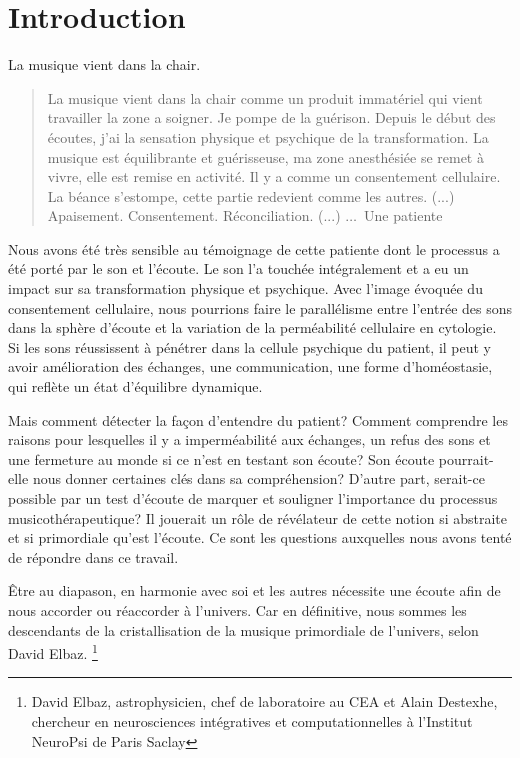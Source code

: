 \chapter{Introduction}

La musique vient dans la chair.

\begin{quotation}
 La musique vient dans la chair comme un produit immatériel
 qui vient travailler la zone a soigner. Je pompe de la
 guérison.
Depuis le début des écoutes, j'ai la sensation physique et
 psychique de la
 transformation.
 La musique est équilibrante et guérisseuse, ma zone
 anesthésiée se remet à vivre, elle est remise en activité.
 Il y a comme un consentement cellulaire.
La béance s'estompe, cette
partie redevient comme les autres. (...)
Apaisement. Consentement. Réconciliation.  (...)
$\ldots$\  Une patiente\autocite{Témoignage}
\end{quotation}

Nous avons été très sensible au témoignage de cette patiente dont le
processus a été porté par le son et l'écoute. Le son l'a touchée intégralement et a eu un impact sur sa transformation physique
et psychique.
Avec l'image évoquée du
consentement cellulaire, nous pourrions faire le
parallélisme entre l'entrée des sons dans la sphère d'écoute et la variation de la 
perméabilité cellulaire en cytologie.\autocite[ch. 3 pp. 70--76]{marieb:biologie}  Si les sons réussissent à pénétrer dans la
cellule psychique du patient, il peut y avoir amélioration des
échanges, une 
communication, une forme d'homéostasie,  \autocite[ch. 1
pp. 10]{marieb:biologie} qui reflète un état d'équilibre dynamique.

Mais comment détecter la façon d'entendre du patient?
Comment comprendre les raisons pour lesquelles il y a imperméabilité aux
échanges, un refus des sons et une fermeture au monde si ce n'est en testant
son écoute?  Son écoute pourrait-elle nous donner certaines clés dans sa
compréhension? D'autre part, serait-ce  possible  par un test d'écoute
de marquer et souligner l'importance du processus musicothérapeutique? 
Il jouerait un
rôle de
révélateur de cette notion si abstraite et si primordiale qu'est l'écoute.
Ce sont les questions auxquelles nous avons tenté de
répondre dans ce travail.


Être au diapason, en harmonie avec soi et les autres
nécessite une écoute afin de nous accorder ou réaccorder à l'univers.
Car en définitive, nous sommes les
descendants de la cristallisation de la musique primordiale de
l'univers, selon
David Elbaz.  \footnote{David Elbaz, astrophysicien, chef de laboratoire au CEA et Alain
Destexhe, chercheur en neurosciences intégratives et computationnelles
à l'Institut  NeuroPsi de Paris Saclay} \autocite{delbaz_recherche_2016}

